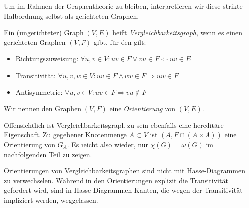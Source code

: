 \documentclass[../main.tex]{subfiles}
\begin{document}
Um im Rahmen der Graphentheorie zu bleiben, interpretieren wir diese strikte Halbordnung selbst als gerichteten Graphen.

\begin{definition}[Vergleichbarkeitsgraph]
    Ein (ungerichteter) Graph $(V, E)$ heißt \emph{Vergleichbarkeitsgraph}, wenn es einen gerichteten Graphen $(V, F)$ gibt, für den gilt:
    \begin{itemize}
        \item Richtungszuweisung: $\forall u, v \in V : uv \in F \vee vu \in F \Leftrightarrow uv \in E$
        \item Transitivität: $\forall u, v, w \in V : uv \in F \wedge vw \in F \Rightarrow uw \in F$
        \item Antisymmetrie: $\forall u, v \in V : uv \in F \Rightarrow vu \notin F$
    \end{itemize}
    Wir nennen den Graphen $(V, F)$ eine \emph{Orientierung} von $(V, E)$.
\end{definition}

Offensichtlich ist Vergleichbarkeitsgraph zu sein ebenfalls eine hereditäre Eigenschaft. Zu gegebener Knotenmenge $A \subset V$ ist $(A, F \cap (A \times A))$ eine Orientierung von $G_A$. Es reicht also wieder, nur $\chi(G) = \omega(G)$ im nachfolgenden Teil zu zeigen.

\begin{bemerkung}
    Orientierungen von Vergleichbarkeitsgraphen sind nicht mit Hasse-Diagrammen zu verwechselen. Während in den Orientierungen explizit die Transitivität gefordert wird, sind in Hasse-Diagrammen Kanten, die wegen der Transitivität impliziert werden, weggelassen.
\end{bemerkung}

\end{document}
